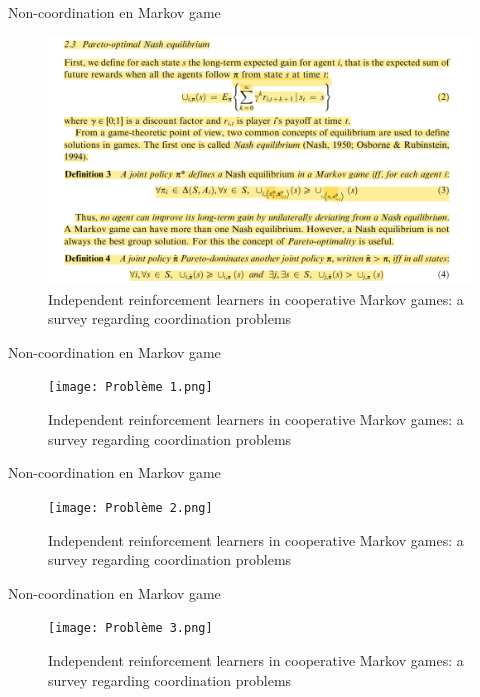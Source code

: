 \documentclass[aspectratio=169,xcolor=dvipsnames]{beamer}
\begin{document}
\begin{frame}{Non-coordination en Markov game}
  \begin{figure}
    \centering
    \includegraphics[scale=0.20]{Définition équilibre.png}
    \caption{\citet{matignon_independent_2012} Independent reinforcement learners in cooperative Markov games: a survey regarding coordination problems}
  \end{figure}
\end{frame}

\begin{frame}{Non-coordination en Markov game}
  \begin{figure}
    \centering
    \texttt{[image: Problème 1.png]}
    \caption{\citet{matignon_independent_2012} Independent reinforcement learners in cooperative Markov games: a survey regarding coordination problems}
  \end{figure}
\end{frame}

\begin{frame}{Non-coordination en Markov game}
  \begin{figure}
    \centering
    \texttt{[image: Problème 2.png]}
    \caption{\citet{matignon_independent_2012} Independent reinforcement learners in cooperative Markov games: a survey regarding coordination problems}
  \end{figure}
\end{frame}

\begin{frame}{Non-coordination en Markov game}
  \begin{figure}
    \centering
    \texttt{[image: Problème 3.png]}
    \caption{\citet{matignon_independent_2012} Independent reinforcement learners in cooperative Markov games: a survey regarding coordination problems}
  \end{figure}
\end{frame}
\end{document}
